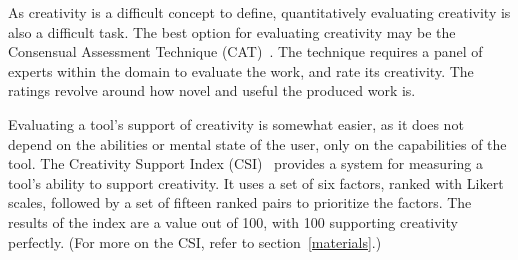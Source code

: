 As creativity is a difficult concept to define, quantitatively evaluating creativity is also a difficult task.
The best option for evaluating creativity may be the Consensual Assessment Technique (CAT)~\cite{Amabile1996}.
The technique requires a panel of experts within the domain to evaluate the work, and rate its creativity.
The ratings revolve around how novel and useful the produced work is.

Evaluating a tool's support of creativity is somewhat easier, as it does not depend on the abilities or mental state of the user, only on the capabilities of the tool.
The Creativity Support Index (CSI)~\cite{carroll2009creativity} provides a system for measuring a tool's ability to support creativity.
It uses a set of six factors, ranked with Likert scales, followed by a set of fifteen ranked pairs to prioritize the factors.
The results of the index are a value out of 100, with 100 supporting creativity perfectly.
(For more on the CSI, refer to section~\ref{materials}.)
